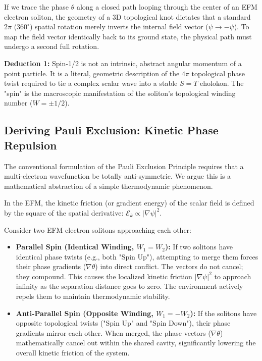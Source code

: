 \documentclass[11pt, twoside]{article}
\begin{document}
If we trace the phase $\theta$ along a closed path looping through the center of an EFM electron soliton, the geometry of a 3D topological knot dictates that a standard $2\pi$ ($360^\circ$) spatial rotation merely inverts the internal field vector ($\psi \to -\psi$). To map the field vector identically back to its ground state, the physical path must undergo a second full rotation. 

\textbf{Deduction 1:} Spin-1/2 is not an intrinsic, abstract angular momentum of a point particle. It is a literal, geometric description of the $4\pi$ topological phase twist required to tie a complex scalar wave into a stable $S=T$ eholokon. The "spin" is the macroscopic manifestation of the soliton's topological winding number ($W = \pm 1/2$).

\subsection{Deriving Pauli Exclusion: Kinetic Phase Repulsion}
The conventional formulation of the Pauli Exclusion Principle requires that a multi-electron wavefunction be totally anti-symmetric. We argue this is a mathematical abstraction of a simple thermodynamic phenomenon. 

In the EFM, the kinetic friction (or gradient energy) of the scalar field is defined by the square of the spatial derivative: $\mathcal{E}_k \propto |\nabla \psi|^2$. 

Consider two EFM electron solitons approaching each other:
\begin{itemize}[leftmargin=*]
    \item \textbf{Parallel Spin (Identical Winding, $W_1 = W_2$):} If two solitons have identical phase twists (e.g., both "Spin Up"), attempting to merge them forces their phase gradients ($\nabla\theta$) into direct conflict. The vectors do not cancel; they compound. This causes the localized kinetic friction $|\nabla \psi|^2$ to approach infinity as the separation distance goes to zero. The environment actively repels them to maintain thermodynamic stability.
    \item \textbf{Anti-Parallel Spin (Opposite Winding, $W_1 = -W_2$):} If the solitons have opposite topological twists ("Spin Up" and "Spin Down"), their phase gradients mirror each other. When merged, the phase vectors ($\nabla\theta$) mathematically cancel out within the shared cavity, significantly lowering the overall kinetic friction of the system.
\end{itemize}
\end{document}
